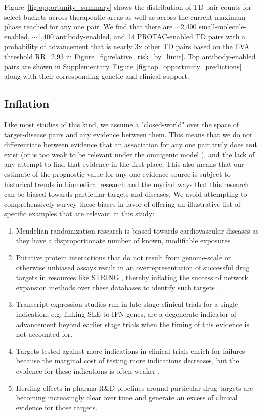 \documentclass{article}
\begin{document}
Figure~\ref{fig:opportunity_summary} shows the distribution of TD pair counts for select buckets across therapeutic areas as well as across the current maximum phase reached for any one pair. We find that there are $\sim$2,400 small-molecule-enabled, $\sim$1,400 antibody-enabled, and 14 PROTAC-enabled TD pairs with a probability of advancement that is nearly 3x other TD pairs based on the EVA threshold RR=2.93 in Figure~\ref{fig:relative_risk_by_limit}. Top antibody-enabled pairs are shown in Supplementary~Figure~\ref{fig:top_opportunity_predictions} along with their corresponding genetic and clinical support.

\subsection{Inflation}
\label{sec:results_inflation}

Like most studies of this kind, we assume a "closed-world" \cite{Paliwal2020-hr} over the space of target-disease pairs and any evidence between them. This means that we do not differentiate between evidence that an association for any one pair truly does \textbf{not} exist (or is too weak to be relevant under the omnigenic model \cite{PMID:28622505}), and the lack of any attempt to find that evidence in the first place. This also means that our estimate of the prognostic value for any one evidence source is subject to historical trends in biomedical research and the myriad ways that this research can be biased towards particular targets and diseases. We avoid attempting to comprehensively survey these biases in favor of offering an illustrative list of specific examples that are relevant in this study:

\begin{enumerate}
\item Mendelian randomization research is biased towards cardiovascular diseases as they have a disproportionate number of known, modifiable exposures \cite{PMID:36736292}
\item Putative protein interactions that do not result from genome-scale or otherwise unbiased assays result in an overrepresentation of successful drug targets in resources like STRING \cite{PMID:36370105}, thereby inflating the success of network expansion methods over these databases to identify such targets \cite{Sadler2023-xd}.
\item Transcript expression studies run in late-stage clinical trials for a single indication, e.g. \cite{PMID:27723281} linking SLE to IFN genes, are a degenerate indicator of advancement beyond earlier stage trials when the timing of this evidence is not accounted for.
\item Targets tested against more indications in clinical trials enrich for failures because the marginal cost of testing more indications decreases, but the evidence for these indications is often weaker \cite{PMID:33262371}.
\item Herding effects in pharma R\&D pipelines around particular drug targets are becoming increasingly clear over time \cite{PMID:37117303} and generate an excess of clinical evidence for those targets.
\end{enumerate}
\end{document}
